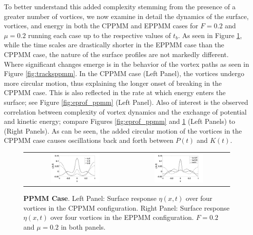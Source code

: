 \documentclass[a4paper,11pt]{article}
\begin{document}
To better understand this added complexity stemming from the presence of a greater number of vortices, we now examine in detail the dynamics of the surface, vortices, and energy in both the CPPMM and EPPMM cases for $F=0.2$ and $\mu=0.2$ running each case up to the respective values of $t_{b}$.  As seen in Figure \ref{fig:surfrepppmm}, while the time scales are drastically shorter in the EPPMM case than the CPPMM case, the nature of the surface profiles are not markedly different.  Where significant changes emerge is in the behavior of the vortex paths as seen in Figure \ref{fig:tracksppmm}.  In the CPPMM case (Left Panel), the vortices undergo more circular motion, thus explaining the longer onset of breaking in the CPPMM case.  This is also reflected in the rate at which energy enters the surface; see Figure \ref{fig:eprof_ppmm} (Left Panel).   Also of interest is the observed correlation between complexity of vortex dynamics and the exchange of potential and kinetic energy; compare Figures \ref{fig:eprof_ppmm} and \ref{fig:surfrepppmm} (Left Panels) to (Right Panels).  As can be seen, the added circular motion of the vortices in the CPPMM case causes oscillations back and forth between $P(t)$ and $K(t)$.
%
\begin{figure}[!h]
\centering
\begin{tabular}{cc}
\includegraphics[width=0.5\textwidth]{surf_resp_mu_pt2_F_pt2_ppmm} & 
\includegraphics[width=0.5\textwidth]{surf_resp_mu_pt2_F_pt2_ppmm_sym}
\end{tabular}
\caption{\small {\bf PPMM Case}. Left Panel: Surface response $\eta(x,t)$ over four vortices in the CPPMM configuration. Right Panel: Surface response $\eta(x,t)$ over four vortices in the EPPMM configuration.  $F=0.2$ and $\mu=0.2$ in both panels.}
\label{fig:surfrepppmm}
\end{figure}
\end{document}
